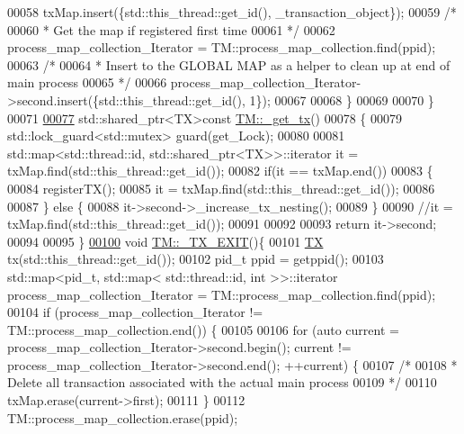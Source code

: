 \begin{DoxyCode}
00058         txMap.insert(\{std::this\_thread::get\_id(), \_transaction\_object\});
00059         \textcolor{comment}{/*}
00060 \textcolor{comment}{         * Get the map if registered first time}
00061 \textcolor{comment}{         */}
00062         process\_map\_collection\_Iterator = TM::process\_map\_collection.find(ppid);
00063         \textcolor{comment}{/*}
00064 \textcolor{comment}{         * Insert to the GLOBAL MAP as a helper to clean up at end of main process }
00065 \textcolor{comment}{         */}
00066         process\_map\_collection\_Iterator->second.insert(\{std::this\_thread::get\_id(), 1\});
00067 
00068     \}
00069 
00070 \}
00071 
\hypertarget{_t_m_8cpp_source.tex_l00077}{}\hyperlink{class_t_m_a41cb0226cc4080c931651b13f74a0075}{00077} std::shared\_ptr<TX>\textcolor{keyword}{const} \hyperlink{class_t_m_a41cb0226cc4080c931651b13f74a0075}{TM::\_get\_tx}()
00078 \{
00079     std::lock\_guard<std::mutex> guard(get\_Lock);
00080 
00081     std::map<std::thread::id, std::shared\_ptr<TX>>::iterator it = txMap.find(std::this\_thread::get\_id());
00082     \textcolor{keywordflow}{if}(it == txMap.end())
00083     \{
00084        registerTX();
00085        it = txMap.find(std::this\_thread::get\_id());
00086        
00087     \} \textcolor{keywordflow}{else} \{
00088         it->second->\_increase\_tx\_nesting();
00089     \}
00090     \textcolor{comment}{//it = txMap.find(std::this\_thread::get\_id());}
00091     
00092 
00093     \textcolor{keywordflow}{return} it->second;
00094 
00095 \}
\hypertarget{_t_m_8cpp_source.tex_l00100}{}\hyperlink{class_t_m_a5e2d1127f2429f2f524d25f430eade06}{00100} \textcolor{keywordtype}{void} \hyperlink{class_t_m_a5e2d1127f2429f2f524d25f430eade06}{TM::\_TX\_EXIT}()\{
00101     \hyperlink{class_t_x}{TX} tx(std::this\_thread::get\_id());
00102     pid\_t ppid = getppid();
00103     std::map<pid\_t, std::map< std::thread::id, int >>::iterator process\_map\_collection\_Iterator = 
      TM::process\_map\_collection.find(ppid);
00104     \textcolor{keywordflow}{if} (process\_map\_collection\_Iterator != TM::process\_map\_collection.end()) \{
00105 
00106         \textcolor{keywordflow}{for} (\textcolor{keyword}{auto} current = process\_map\_collection\_Iterator->second.begin(); current != 
      process\_map\_collection\_Iterator->second.end(); ++current) \{
00107             \textcolor{comment}{/*}
00108 \textcolor{comment}{             * Delete all transaction associated with the actual main process}
00109 \textcolor{comment}{             */}
00110             txMap.erase(current->first);
00111         \}
00112         TM::process\_map\_collection.erase(ppid);

\end{DoxyCode}
